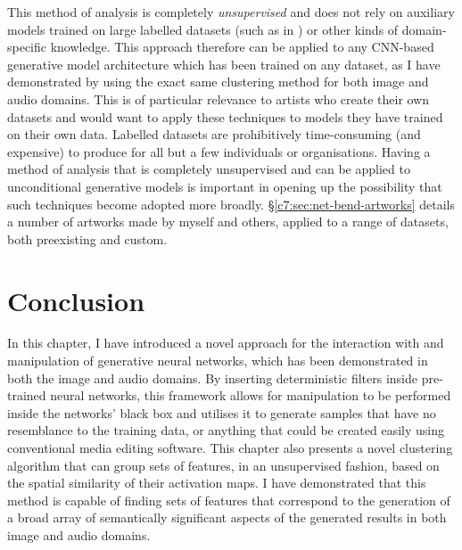 This method of analysis is completely \emph{unsupervised} and does not rely on auxiliary models trained on large labelled datasets (such as in \citep{Bau2018-td, isola2017image, park2019semantic}) or other kinds of domain-specific knowledge. 
This approach therefore can be applied to any CNN-based generative model architecture which has been trained on any dataset, as I have demonstrated by using the exact same clustering method for both image and audio domains. 
This is of particular relevance to artists who create their own datasets and would want to apply these techniques to models they have trained on their own data. 
Labelled datasets are prohibitively time-consuming (and expensive) to produce for all but a few individuals or organisations. 
Having a method of analysis that is completely unsupervised and can be applied to unconditional generative models is important in opening up the possibility that such techniques become adopted more broadly.
\S \ref{c7:sec:net-bend-artworks} details a number of artworks made by myself and others, applied to a range of datasets, both preexisting and custom.



\section{Conclusion}

In this chapter, I have introduced a novel approach for the interaction with and manipulation of generative neural networks, which has been demonstrated in both the image and audio domains. 
By inserting deterministic filters inside pre-trained neural networks, this framework allows for manipulation to be performed inside the networks' black box and utilises it to generate samples that have no resemblance to the training data, or anything that could be created easily using conventional media editing software. 
This chapter also presents a novel clustering algorithm that can group sets of features, in an unsupervised fashion, based on the spatial similarity of their activation maps. 
I have demonstrated that this method is capable of finding sets of features that correspond to the generation of a broad array of semantically significant aspects of the generated results in both image and audio domains. 


